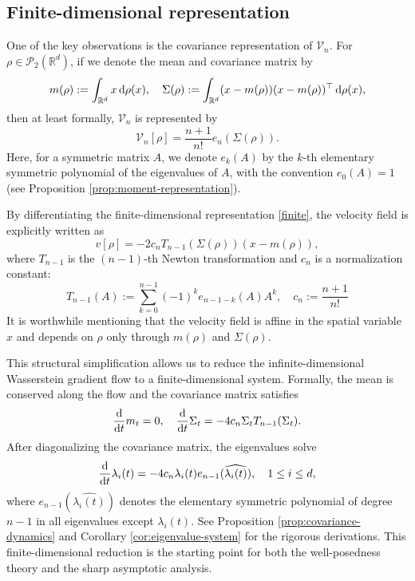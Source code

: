 \documentclass[11pt,reqno]{amsart}
\numberwithin{figure}{section}
\def\d {{\partial}}
\newcommand{\bbr}{\mathbb R}
\def\d{\mathrm{d}}
\renewcommand{\d}{  {\textup{d}} }
\begin{document}
\subsection{Finite-dimensional representation}
One of the key observations is the covariance representation of $\mathcal V_n$. For $\rho\in \mathcal P_2(\bbr^d)$, if we denote the mean and covariance matrix by
\begin{equation}\label{defmS}
m(\rho):=\int_{\mathbb R^d}x\,\d\rho(x),
\quad
\Sigma(\rho):=\int_{\mathbb R^d}(x-m(\rho))(x-m(\rho))^\top\,\d\rho(x),
\end{equation}
then at least formally, $\mathcal V_n$ is represented by 
\begin{equation} \label{finite}
\mathcal V_n[\rho] = \frac{n+1}{n!} e_n(\Sigma(\rho)).
\end{equation}
Here, for a symmetric matrix $A$, we denote  $e_k(A)$ by the $k$-th elementary symmetric polynomial of the eigenvalues of $A$, with the convention $e_0(A)=1$ (see Proposition \ref{prop:moment-representation}). 

By differentiating the finite-dimensional representation \eqref{finite}, the velocity field is explicitly written as 
\[
v[\rho] = -2c_n T_{n-1}(\Sigma(\rho))(x-m(\rho)),
\]
where $T_{n-1}$ is the $(n-1)$-th Newton transformation and $c_n$ is a normalization constant:
\[
T_{n-1}(A):=\sum_{k=0}^{n-1}(-1)^k e_{n-1-k}(A)A^k,\quad c_n:=\frac{n+1}{n!}
\]
It is worthwhile mentioning that the velocity field is affine in the spatial variable $x$ and depends on $\rho$ only through $m(\rho)$ and $\Sigma(\rho)$. 

This structural simplification allows us to reduce the infinite-dimensional Wasserstein gradient flow to a finite-dimensional system. Formally, the mean is conserved along the flow and the covariance matrix satisfies
\[
\frac{\d}{\d t} m_t =0,\quad \frac{\d}{\d t} \Sigma_t = -4c_n \Sigma_t T_{n-1}(\Sigma_t).
\]
 After diagonalizing the covariance matrix, the eigenvalues solve
\[
\frac{\d}{\d t} \lambda_i(t) = -4c_n \lambda_i(t) e_{n-1} (\widehat{\lambda_i(t)}), \quad 1\leq i \leq d,
\]
where $e_{n-1}(\widehat{\lambda_i(t)})$ denotes the elementary symmetric polynomial of degree $n-1$ in all eigenvalues except $\lambda_i(t)$. See Proposition  \ref{prop:covariance-dynamics}  and Corollary \ref{cor:eigenvalue-system} for the rigorous derivations. This finite-dimensional reduction is the starting point for both the well-posedness theory and the sharp asymptotic analysis.
\end{document}

